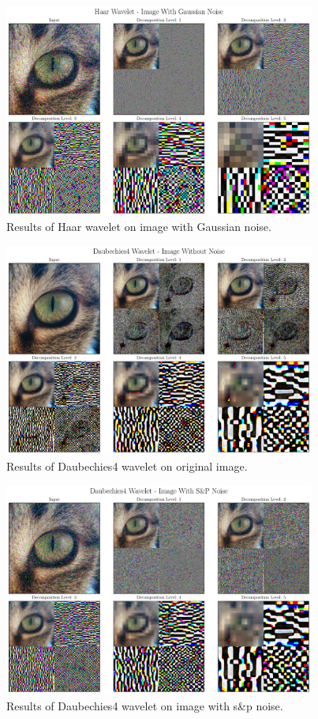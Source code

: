 \documentclass[12pt]{article}
\begin{document}
	\begin{figure}[!h]
		\centering
		\includegraphics[height=7cm]{../Tests/Outputs/2D_HaarWavelet_GaussianNoise.pdf}
		\caption{Results of Haar wavelet on image with Gaussian noise.}
		\label{fig:2d_haar_gs}
	\end{figure}
	
	\begin{figure}[!h]
		\centering
		\includegraphics[height=7cm]{../Tests/Outputs/2D_Daubechies4Wavelet_WithoutNoise.pdf}
		\caption{Results of Daubechies4 wavelet on original image.}
		\label{fig:2d_db4}
	\end{figure}
	
	\begin{figure}[!h]
		\centering
		\includegraphics[height=7cm]{../Tests/Outputs/2D_Daubechies4Wavelet_SPNoise.pdf}
		\caption{Results of Daubechies4 wavelet on image with s\&p noise.}
		\label{fig:2d_db4_sp}
	\end{figure}
	
\end{document}
